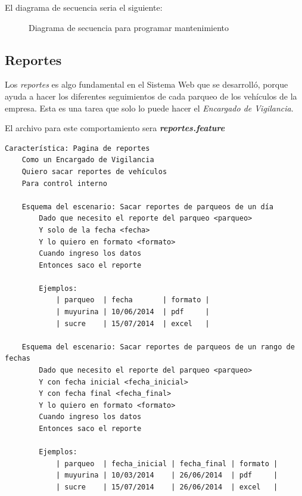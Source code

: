 El diagrama de secuencia seria el siguiente:

\begin{figure}[h]
  \begin{center}
    \def\svgscale{0.6}
    
    \caption[Diagrama de secuencia - Programar mantenimiento]{
    Diagrama de secuencia para programar mantenimiento}
  \end{center}
\end{figure}
\subsection{Reportes}
Los {\it reportes} es algo fundamental en el Sistema Web que se desarrolló, porque ayuda
a hacer los diferentes seguimientos de cada parqueo de los vehículos de la empresa.
Esta es una tarea que solo lo puede hacer el {\it Encargado de Vigilancia}.

El archivo para este comportamiento sera {\it \bfseries reportes.feature}

{\scriptsize
\begin{verbatim}
Característica: Pagina de reportes
    Como un Encargado de Vigilancia
    Quiero sacar reportes de vehículos
    Para control interno

    Esquema del escenario: Sacar reportes de parqueos de un día
        Dado que necesito el reporte del parqueo <parqueo>
        Y solo de la fecha <fecha>
        Y lo quiero en formato <formato>
        Cuando ingreso los datos
        Entonces saco el reporte

        Ejemplos:
            | parqueo  | fecha       | formato |
            | muyurina | 10/06/2014  | pdf     |
            | sucre    | 15/07/2014  | excel   |

    Esquema del escenario: Sacar reportes de parqueos de un rango de fechas
        Dado que necesito el reporte del parqueo <parqueo>
        Y con fecha inicial <fecha_inicial>
        Y con fecha final <fecha_final>
        Y lo quiero en formato <formato>
        Cuando ingreso los datos
        Entonces saco el reporte

        Ejemplos:
            | parqueo  | fecha_inicial | fecha_final | formato |
            | muyurina | 10/03/2014    | 26/06/2014  | pdf     |
            | sucre    | 15/07/2014    | 26/06/2014  | excel   |
\end{verbatim}
}

